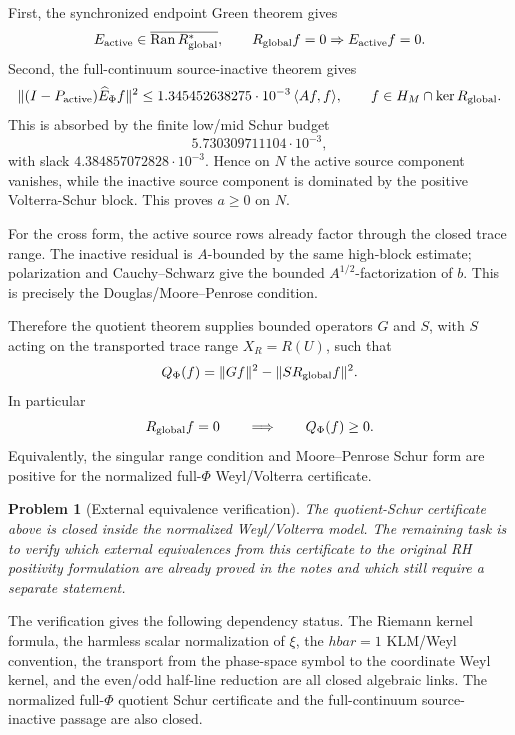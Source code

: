 \documentclass[11pt]{article}
\newtheorem{problem}[theorem]{Problem}
\begin{document}
First, the synchronized endpoint Green theorem gives
\[
  E_{\rm active}\in\overline{\operatorname{Ran}R_{\rm global}^{\ast}},
  \qquad
  R_{\rm global}f=0\Rightarrow E_{\rm active}f=0.
\]
Second, the full-continuum source-inactive theorem gives
\[
  \|(I-P_{\rm active})\widehat E_\Phi f\|^2
  \le 1.345452638275\cdot10^{-3}\,\langle Af,f\rangle,
  \qquad f\in H_M\cap\ker R_{\rm global}.
\]
This is absorbed by the finite low/mid Schur budget
\[
  5.730309711104\cdot10^{-3},
\]
with slack \(4.384857072828\cdot10^{-3}\).  Hence on \(N\) the active source
component vanishes, while the inactive source component is dominated by the
positive Volterra-Schur block.  This proves \(a\ge0\) on \(N\).

For the cross form, the active source rows already factor through the closed
trace range.  The inactive residual is \(A\)-bounded by the same high-block
estimate; polarization and Cauchy--Schwarz give the bounded
\(A^{1/2}\)-factorization of \(b\).  This is precisely the
Douglas/Moore--Penrose condition.

Therefore the quotient theorem supplies bounded operators \(G\) and \(S\), with
\(S\) acting on the transported trace range \(X_R=R(U)\), such that
\[
  Q_\Phi(f)=\|Gf\|^2-\|S R_{\rm global}f\|^2.
\]
In particular
\[
  R_{\rm global}f=0\qquad\Longrightarrow\qquad Q_\Phi(f)\ge0.
\]
Equivalently, the singular range condition and Moore--Penrose Schur form are
positive for the normalized full-\(\Phi\) Weyl/Volterra certificate.

\begin{problem}[External equivalence verification]
The quotient-Schur certificate above is closed inside the normalized
Weyl/Volterra model.  The remaining task is to verify which external
equivalences from this certificate to the original RH positivity formulation
are already proved in the notes and which still require a separate statement.
\end{problem}

The verification gives the following dependency status.  The Riemann kernel formula,
the harmless scalar normalization of \(\xi\), the \(hbar=1\) KLM/Weyl
convention, the transport from the phase-space symbol to the coordinate Weyl
kernel, and the even/odd half-line reduction are all closed algebraic links.
The normalized full-\(\Phi\) quotient Schur certificate and the full-continuum
source-inactive passage are also closed.
\end{document}
